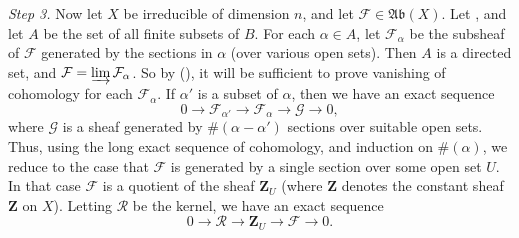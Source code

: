 {\emph{Step 3.} Now let $X$ be irreducible of dimension $n$, and let $\mathcal F\in\mathfrak{Ab}(X)$. Let , and let $A$ be the set of all finite subsets of $B$. For each $\alpha\in A$, let $\mathcal F_\alpha$ be the subsheaf of $\mathcal F$ generated by the sections in $\alpha$ (over various open sets). Then $A$ is a directed set, and $\mathcal F=\varinjlim\mathcal F_\alpha$. So by (), it will be sufficient to prove vanishing of cohomology for each $\mathcal F_\alpha$. If $\alpha'$ is a subset of $\alpha$, then we have an exact sequence
\[
  0\to\mathcal F_{\alpha'}\to\mathcal F_\alpha\to\mathcal G\to0,
\]
where $\mathcal G$ is a sheaf generated by $\#(\alpha-\alpha')$ sections over suitable open sets. Thus, using the long exact sequence of cohomology, and induction on $\#(\alpha)$, we reduce to the case that $\mathcal F$ is generated by a single section over some open set $U$. In that case $\mathcal F$ is a quotient of the sheaf $\mathbf Z_U$ (where $\mathbf Z$ denotes the constant sheaf $\mathbf Z$ on $X$). Letting $\mathcal R$ be the kernel, we have an exact sequence
\[
  0\to\mathcal R\to\mathbf Z_U\to\mathcal F\to0.
\]
}
